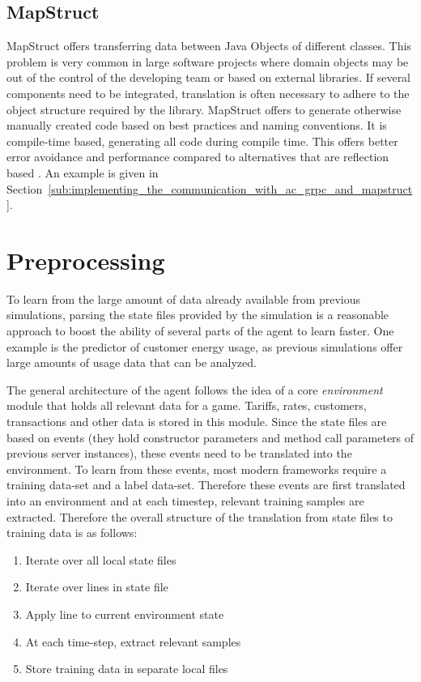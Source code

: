 \subsection{MapStruct}%
\label{sub:mapstruct}

MapStruct offers transferring data between Java Objects of different classes. This problem is very common in large
software projects where domain objects may be out of the control of the developing team or based on external libraries.
If several components need to be integrated, translation is often necessary to adhere to the object structure required
by the library. MapStruct offers to generate otherwise manually created code based on best practices and naming
conventions. It is compile-time based, generating all code during compile time. This offers better error avoidance and
performance compared to alternatives that are reflection based
\citep[]{mapstruct}.
An example is given in Section~\ref{sub:implementing_the_communication_with_ac_grpc_and_mapstruct}.

\section{Preprocessing}

To learn from the large amount of data already available from previous simulations, parsing the state files provided by
the simulation is a reasonable approach to boost the ability of several parts of the agent to learn faster. One example
is the predictor of customer energy usage, as previous simulations offer large amounts of usage data that can be
analyzed.

The general architecture of the agent follows the idea of a core \emph{environment} module that holds all relevant data
for a game. Tariffs, rates, customers, transactions and other data is stored in this module. Since the state files are
based on events (they hold constructor parameters and method call parameters of previous server instances), these events
need to be translated into the environment. To learn from these events, most modern frameworks require a training
data-set and a label data-set. Therefore these events are first translated into an environment and at each timestep,
relevant training samples are extracted. Therefore the overall structure of the translation from state files to training
data is as follows:

\begin{enumerate}
    \item Iterate over all local state files
    \item Iterate over lines in state file
    \item Apply line to
        current environment state
    \item At each time-step, extract relevant samples
    \item Store training data in separate local
files \end{enumerate}

